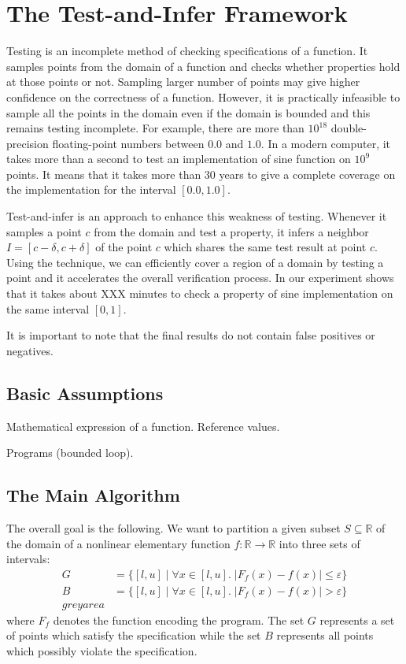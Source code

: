 \section{The Test-and-Infer Framework}

Testing is an incomplete method of checking specifications of a
function. It samples points from the domain of a function and checks
whether properties hold at those points or not. Sampling larger number
of points may give higher confidence on the correctness of a function.
However, it is practically infeasible to sample all the points in the
domain even if the domain is bounded and this remains testing
incomplete. For example, there are more than $10^{18}$ double-precision
floating-point numbers between $0.0$ and $1.0$. In a modern computer,
it takes more than a second to test an implementation of sine function
on $10^9$ points. It means that it takes more than 30 years to give a
complete coverage on the implementation for the interval $[0.0, 1.0]$.

Test-and-infer is an approach to enhance this weakness of testing.
Whenever it samples a point $c$ from the domain and test a property,
it infers a neighbor $I = [c - \delta, c + \delta]$ of the point $c$
which shares the same test result at point $c$. Using the technique,
we can efficiently cover a region of a domain by testing a point and
it accelerates the overall verification process. In our experiment
shows that it takes about XXX minutes to check a property of sine
implementation on the same interval $[0, 1]$.

It is important to note that the final results do not contain false positives or negatives. 

\subsection{Basic Assumptions}

Mathematical expression of a function. Reference values. 

Programs (bounded loop). 

\subsection{The Main Algorithm}
The overall goal is the following. We want to partition a given subset $S \subseteq \mathbb{R}$ of the
domain of a nonlinear elementary function $f : \mathbb{R} \to
\mathbb{R}$ into three sets of intervals:
\begin{align*}
  G & = \{ [l, u] \mid \forall x \in [l, u]. \; | F_f(x) - f(x) | \le \varepsilon \}\\
  B & = \{ [l, u] \mid \forall x \in [l, u]. \; | F_f(x) - f(x) | > \varepsilon \}\\
  grey area &
\end{align*}
where $F_f$ denotes the function encoding the program. The set $G$
represents a set of points which satisfy the specification while the
set $B$ represents all points which possibly violate the
specification. 

